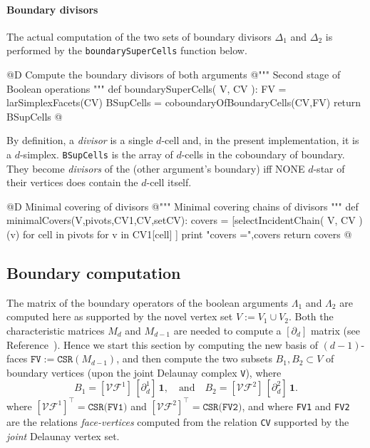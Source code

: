 \documentclass[11pt,oneside]{article}	%
\begin{document}
\paragraph{Boundary divisors}
The actual computation of the two sets of boundary divisors $\Delta_1$ and $\Delta_2$ is performed by the \texttt{boundarySuperCells} function below.

@D Compute the boundary divisors of both arguments
@{""" Second stage of Boolean operations """
def boundarySuperCells( V, CV ):
	FV = larSimplexFacets(CV)
	BSupCells = coboundaryOfBoundaryCells(CV,FV)
	return BSupCells
@}


By definition, a \emph{divisor} is a single $d$-cell and, in the present implementation, it is a $d$-simplex. \texttt{BSupCells} is the array of $d$-cells in the coboundary of boundary. They become \emph{divisors} of the (other argument's boundary) iff NONE $d$-star of their vertices does contain the $d$-cell itself.

@D Minimal covering of divisors
@{""" Minimal covering chains of divisors """
def minimalCovers(V,pivots,CV1,CV,setCV):
	covers = [selectIncidentChain( V, CV )(v) for cell in pivots for v in CV1[cell] ]
	print "\n covers =",covers
	return covers
@}




\subsection{Boundary computation}
The matrix of the boundary operators of the boolean arguments $\Lambda_1$ and $\Lambda_2$ are computed here as supported by the novel vertex set $V := V_1 \cup V_2$. Both the characteristic matrices $M_d$ and $M_{d-1}$ are needed to compute a $[\partial_d]$ matrix (see Reference~\cite{Dicarlo:2014:TNL:2543138.2543294}). Hence we start this section by computing the new basis of $(d-1)$-faces $\texttt{FV} := \texttt{CSR}(M_{d-1})$, and then compute the two subsets $B_1,B_2 \subset V$ of boundary vertices (upon the joint Delaunay complex \texttt{V}), where
\[
B_1 = [\mathcal{VF}^1]\, [\partial_d^1]\,\mathbf{1},
\quad\mbox{and}\quad
B_2 = [\mathcal{VF}^2]\, [\partial_d^2]\,\mathbf{1}.
\]
where $[\mathcal{VF}^1]^\top = \texttt{CSR(FV1)}$ and $[\mathcal{VF}^2]^\top = \texttt{CSR(FV2)}$,
and where \texttt{FV1} and \texttt{FV2} are the relations \emph{face-vertices} computed from the relation \texttt{CV} supported by the \emph{joint} Delaunay vertex set. 
\end{document}
